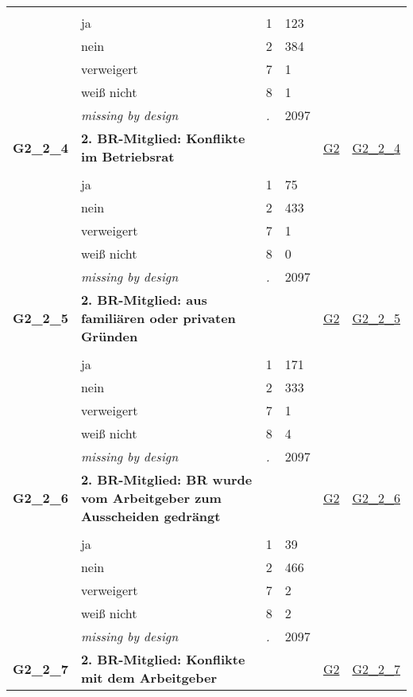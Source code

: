 \begin{longtable}{| L{2.45cm} | L{6cm} | C{1.5cm} | R{1cm} | C{2.25cm} | C{2.25cm} |}
   &  &  &  &  &  \\ 
   & ja & 1 & 123 &  &  \\ 
   & nein & 2 & 384 &  &  \\ 
   & verweigert & 7 & 1 &  &  \\ 
   & weiß nicht & 8 & 1 &  &  \\ 
   & \textit{missing by design} & \textit{.} & 2097 &  &  \\ 
   \midrule
\textbf{G2\_2\_4}\label{var:G2:2:4} & \textbf{2. BR-Mitglied: Konflikte im Betriebsrat} &  &  & \hyperref[G2]{G2} & \hyperref[var:suf:G2:2:4]{G2\_2\_4} \\ 
   &  &  &  &  &  \\ 
   & ja & 1 & 75 &  &  \\ 
   & nein & 2 & 433 &  &  \\ 
   & verweigert & 7 & 1 &  &  \\ 
   & weiß nicht & 8 & 0 &  &  \\ 
   & \textit{missing by design} & \textit{.} & 2097 &  &  \\ 
   \midrule
\textbf{G2\_2\_5}\label{var:G2:2:5} & \textbf{2. BR-Mitglied: aus familiären oder privaten Gründen} &  &  & \hyperref[G2]{G2} & \hyperref[var:suf:G2:2:5]{G2\_2\_5} \\ 
   &  &  &  &  &  \\ 
   & ja & 1 & 171 &  &  \\ 
   & nein & 2 & 333 &  &  \\ 
   & verweigert & 7 & 1 &  &  \\ 
   & weiß nicht & 8 & 4 &  &  \\ 
   & \textit{missing by design} & \textit{.} & 2097 &  &  \\ 
   \midrule
\textbf{G2\_2\_6}\label{var:G2:2:6} & \textbf{2. BR-Mitglied: BR wurde vom Arbeitgeber zum Ausscheiden gedrängt} &  &  & \hyperref[G2]{G2} & \hyperref[var:suf:G2:2:6]{G2\_2\_6} \\ 
   &  &  &  &  &  \\ 
   & ja & 1 & 39 &  &  \\ 
   & nein & 2 & 466 &  &  \\ 
   & verweigert & 7 & 2 &  &  \\ 
   & weiß nicht & 8 & 2 &  &  \\ 
   & \textit{missing by design} & \textit{.} & 2097 &  &  \\ 
   \midrule
\textbf{G2\_2\_7}\label{var:G2:2:7} & \textbf{2. BR-Mitglied: Konflikte mit dem Arbeitgeber} &  &  & \hyperref[G2]{G2} & \hyperref[var:suf:G2:2:7]{G2\_2\_7} \\ 

\end{longtable}
